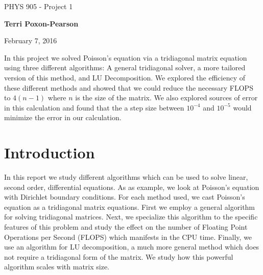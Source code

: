 \documentclass[%
oneside,                 %
final,                   %
10pt]{article}
\begin{document}

\newcommand{\exercisesection}[1]{\subsection*{#1}}






\thispagestyle{empty}

\begin{center}
{\LARGE\bf
\begin{spacing}{1.25}
PHYS 905 - Project 1
\end{spacing}
}
\end{center}


\begin{center}
{\bf Terri Poxon-Pearson}
\end{center}

    

\begin{center}
February 7, 2016
\end{center}

\vspace{1cm}

In this project we solved Poisson's equation via a tridiagonal matrix equation using three different algorithms:  A general tridiagonal solver, a more tailored version of this method, and LU Decomposition.  We explored the efficiency of these different methods and showed that we could reduce the necessary FLOPS to $4(n-1)$ where $n$ is the size of the matrix.  We also explored sources of error in this calculation and found that the a step size between $10^{-4}$ and $10^{-5}$ would minimize the error in our calculation.

\tableofcontents
 
\section{Introduction}
In this report we study different algorithms which can be used to solve linear, second order, differential equations.  As as example, we look at Poisson's equation with Dirichlet boundary conditions.  For each method used, we cast Poisson's equation as a tridiagonal matrix equations.  First we employ a general algorithm for solving tridiagonal matrices.  Next, we specialize this algorithm to the specific features of this problem and study the effect on the number of Floating Point Operations per Second (FLOPS) which manifests in the CPU time.  Finally, we use an algorithm for LU decomposition, a much more general method which does not require a tridiagonal form of the matrix.  We study how this powerful algorithm scales with matrix size.
\end{document}
